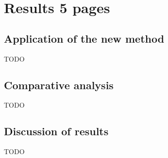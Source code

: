 \section{Results 5 pages}

\subsection{Application of the new method}
TODO

\subsection{Comparative analysis}
TODO

\subsection{Discussion of results}
TODO
